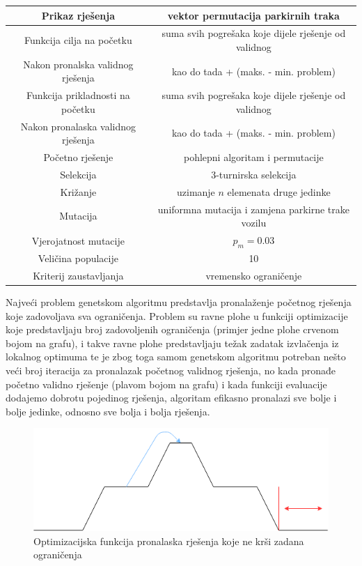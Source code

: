\documentclass[11pt]{article}
\begin{document}
\begin{center}
\centering

  \begin{tabular}{ | >{\columncolor[gray]{0.6}}c |c|}
    \hline
     Prikaz rješenja & vektor permutacija parkirnih traka \\ \hline
     Funkcija cilja na početku & suma svih pogrešaka koje dijele rješenje od validnog \\ 
               Nakon pronalska validnog rješenja & kao do tada + (maks.  - min. problem) \\ \hline
     Funkcija prikladnosti na početku &  suma svih pogrešaka koje dijele rješenje od validnog\\ 
     Nakon pronalaska validnog rješenja &  kao do tada + (maks.  - min. problem) \\ \hline
     Početno rješenje &  pohlepni algoritam i permutacije \\ \hline
     Selekcija &  3-turnirska selekcija\\ \hline
     Križanje &  uzimanje $n$ elemenata druge jedinke\\ \hline
     Mutacija &  uniformna mutacija i zamjena parkirne trake vozilu\\ \hline
     Vjerojatnost mutacije &  $p_m=0.03$ \\ \hline
     Veličina populacije &  10\\ \hline
     Kriterij zaustavljanja & vremensko ograničenje \\ \hline
\end{tabular}
 \label{tab:title} 
\end{center}
\newpage

Najveći problem genetskom algoritmu predstavlja pronalaženje početnog rješenja koje zadovoljava sva ograničenja. Problem su ravne plohe u funkciji optimizacije koje predstavljaju broj zadovoljenih ograničenja (primjer jedne plohe crvenom bojom na grafu), i takve ravne plohe predstavljaju težak zadatak izvlačenja iz lokalnog optimuma te je zbog toga samom genetskom algoritmu potreban nešto veći broj iteracija za pronalazak početnog validnog rješenja, no kada pronađe početno validno rješenje (plavom bojom na grafu) i kada funkciji evaluacije dodajemo dobrotu pojedinog rješenja, algoritam efikasno pronalazi sve bolje i bolje jedinke, odnosno sve bolja i bolja rješenja.
\begin{center}
\begin{figure}
  \includegraphics[width=\linewidth]{fjaOptimizacije.png}
  \caption{Optimizacijska funkcija pronalaska rješenja koje ne krši zadana ograničenja }
  \label{fig:optFun}
\end{figure}

\end{center}
\end{document}
